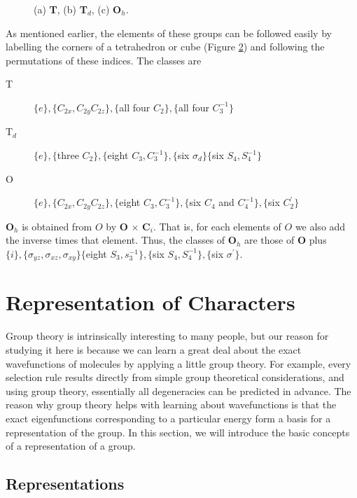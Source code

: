 \begin{figure}
\caption{(a) {\bf T}, (b) {\bf T}$_d$, (c) {\bf O}$_h$.}
\label{chap16-fig29}
\end{figure}

\begin{figure}
\caption{}
\label{chap16-fig30}
\end{figure}

As mentioned earlier, the elements of these groups can be followed 
easily by labelling the corners of a tetrahedron or cube (Figure
\ref{chap16-fig30})
and following the permutations of these indices.  The classes are
\begin{description}
\item[T] $\{e\} , \{C_{2x},C_{2y}C_{2z}\},\{$all four 
$C_2\},\{$all four $C_3^{-1}\}$
\item[T$_d$] $\{e\},\{$three $C_2\},\{$eight 
$C_3,C_3^{-1}\},\{$six $\sigma_d\}\{$six $S_4,S_4^{-1}\}$
\item[O] $\{e\}, \{C_{2x},C_{2y}C_{2z}\},\{$eight 
$C_3,C_3^{-1}\},\{$six $C_4$ and $C_4^{-1}\},\{$six $C_2^{\prime}\}$
\end{description}
{\bf O}$_h$ is obtained from $O$ by {\bf O} $\times$ {\bf C}$_i$. 
That is, for each elements of $O$ we also add the inverse times that 
element.  Thus, the classes of {\bf O}$_h$ are those of {\bf O} plus 
$\{i\},\{\sigma_{yz}, \sigma_{xz} , \sigma_{xy}\}\{$eight $S_3, 
s_3^{-1}\},\{$six $S_4,S_4^{-1}\},\{$six $\sigma^{\prime}\}$.

\section{Representation of Characters}

Group theory is intrinsically interesting to many people, but our 
reason for studying it here is because we can learn a great deal about 
the exact wavefunctions of molecules by applying a little group 
theory.  For example, every selection rule results directly from 
simple group theoretical considerations, and using group theory, 
essentially all degeneracies can be predicted in advance.  The reason 
why group theory helps with learning about wavefunctions is that the 
exact eigenfunctions corresponding to a particular energy form a basis 
for a representation of the group.  In this section, we will 
introduce the basic concepts of a representation of a group.

\subsection{Representations}

